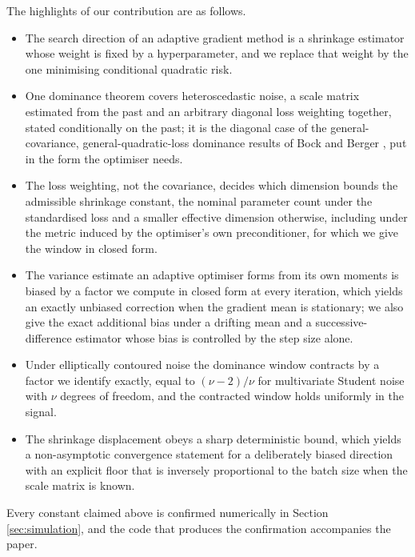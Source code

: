 \documentclass[pdflatex,sn-mathphys-num]{sn-jnl}%
\theoremstyle{thmstyleone}%
\theoremstyle{thmstyletwo}%
\theoremstyle{thmstylethree}%
\newcommand{\rev}[1]{{\color{blue}#1}}
\begin{document}
The highlights of our contribution are as follows. 
\begin{itemize}

\item The search direction of an adaptive gradient method is a shrinkage estimator whose weight is fixed by a hyperparameter, and we replace that weight by the one minimising conditional quadratic risk.

\item One dominance theorem covers heteroscedastic noise, a scale matrix estimated from the past and an arbitrary diagonal loss weighting together\rev{, stated conditionally on the past; it is the diagonal case of the general-covariance, general-quadratic-loss dominance results of Bock \cite{bock1975} and Berger \cite{berger1976jmva}, put in the form the optimiser needs.}

\item The loss weighting, not the covariance, decides which dimension bounds the admissible shrinkage constant, the nominal parameter count under the standardised loss and a smaller effective dimension otherwise\rev{, including under the metric induced by the optimiser's own preconditioner, for which we give the window in closed form.}

\item The variance estimate an adaptive optimiser forms from its own moments is biased by a factor we compute in closed form at every iteration, which yields an exactly unbiased correction\rev{ when the gradient mean is stationary; we also give the exact additional bias under a drifting mean and a successive-difference estimator whose bias is controlled by the step size alone.}

\item Under elliptically contoured noise the dominance window contracts by a factor we identify exactly, equal to $(\nu-2)/\nu$ for multivariate Student noise with $\nu$ degrees of freedom\rev{, and the contracted window holds uniformly in the signal.}

\item The shrinkage displacement obeys a sharp deterministic bound, which yields a non-asymptotic convergence statement for a deliberately biased direction with an explicit floor that is inversely proportional to the batch size\rev{ when the scale matrix is known.}

\end{itemize}

Every constant claimed above is confirmed numerically in Section \ref{sec:simulation}, and the code that produces the confirmation accompanies the paper.
\end{document}
